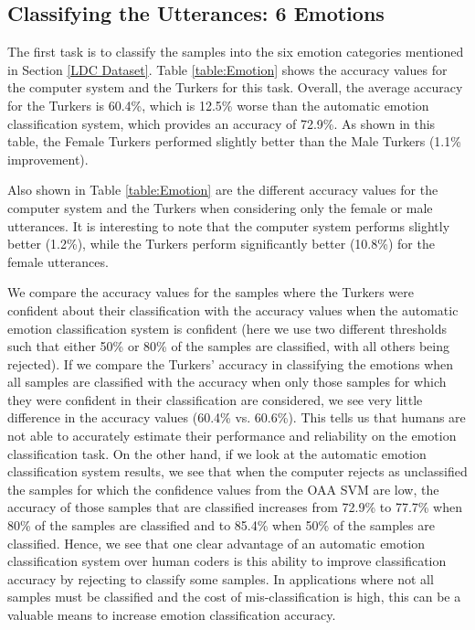\documentclass{article}
\begin{document}
\subsection{Classifying the Utterances: 6 Emotions}
The first task is to classify the samples into the six emotion categories mentioned in Section \ref{LDC Dataset}. Table \ref{table:Emotion} shows the accuracy values for the computer system and the Turkers for this task. Overall, the average accuracy for the Turkers is 60.4\%, which is 12.5\% worse than the automatic emotion classification system, which provides an accuracy of 72.9\%. As shown in this table, the Female Turkers performed slightly better than the Male Turkers (1.1\% improvement).\par		
Also shown in Table \ref{table:Emotion} are the different accuracy values for the computer system and the Turkers when considering only the female or male utterances.  It is interesting to note that the computer system performs slightly better (1.2\%), while the Turkers perform significantly better (10.8\%) for the female utterances. \par	
We compare the accuracy values for the samples where the Turkers were confident about their classification with the accuracy values when the automatic emotion classification system is confident (here we use two different thresholds such that either 50\% or 80\% of the samples are classified, with all others being rejected). If we compare the Turkers' accuracy in classifying the emotions when all samples are classified with the accuracy when only those samples for which they were confident in their classification are considered, we see very little difference in the accuracy values (60.4\% vs. 60.6\%). This tells us that humans are not able to accurately estimate their performance and reliability on the emotion classification task.  On the other hand, if we look at the automatic emotion classification system results, we see that when the computer rejects as unclassified the samples for which the confidence values from the OAA SVM are low, the accuracy of those samples that are classified increases from 72.9\% to 77.7\% when 80\% of the samples are classified and to 85.4\% when 50\% of the samples are classified.  Hence, we see that one clear advantage of an automatic emotion classification system over human coders is this ability to improve classification accuracy by rejecting to classify some samples.  In applications where not all samples must be classified and the cost of mis-classification is high, this can be a valuable means to increase emotion classification accuracy. \par
\end{document}
